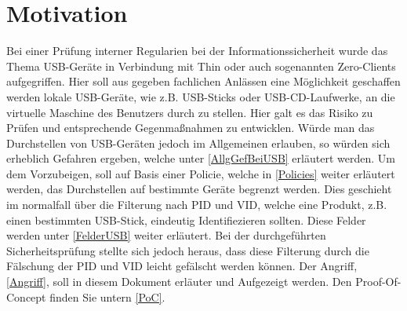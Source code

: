 \documentclass[a4paper,11pt,DIV=11,BROC=5mm,bigheadings,idxtotoc,cleardoubleempty,halfparskip,oneside,openright]{scrreprt} %
\begin{document}
			
						
				\cleardoublepage

			
				\cleardoublepage	
					
			\tableofcontents
				\cleardoublepage	
		
			\printnomenclature
				\cleardoublepage	
			
			\setcounter{page}{1}            
            \cleardoublepage
            
            
                \cleardoublepage
                
			\chapter{Motivation}
Bei einer Prüfung interner Regularien bei der Informationssicherheit wurde das Thema USB-Geräte in Verbindung mit Thin oder auch sogenannten Zero-Clients aufgegriffen. Hier soll aus gegeben fachlichen Anlässen eine Möglichkeit geschaffen werden lokale USB-Geräte, wie z.B. USB-Sticks oder USB-CD-Laufwerke, an die virtuelle Maschine des Benutzers durch zu stellen. Hier galt es das Risiko zu Prüfen und entsprechende Gegenmaßnahmen zu entwicklen. Würde man das Durchstellen von USB-Geräten jedoch im Allgemeinen erlauben, so würden sich erheblich Gefahren ergeben, welche unter \ref{AllgGefBeiUSB} erläutert werden. Um dem Vorzubeigen, soll auf Basis einer Policie, welche in \ref{Policies} weiter erläutert werden, das Durchstellen auf bestimmte Geräte begrenzt werden. Dies geschieht im normalfall über die Filterung nach PID und VID, welche eine Produkt, z.B. einen bestimmten USB-Stick, eindeutig Identifiezieren sollten. Diese Felder werden unter \ref{FelderUSB} weiter erläutert. Bei der durchgeführten Sicherheitsprüfung stellte sich jedoch heraus, dass diese Filterung durch die Fälschung der PID und VID leicht gefälscht werden können. Der Angriff, \ref{Angriff}, soll in diesem Dokument erläuter und Aufgezeigt werden. Den Proof-Of-Concept finden Sie untern \ref{PoC}.
		
\end{document}
